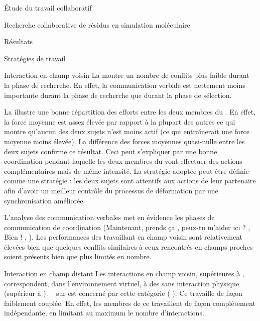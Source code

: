 \documentclass[myfrancais]{mythesis}
\begin{document}
\begin{mypart}{Étude du travail collaboratif}
\begin{mychapter}{Recherche collaborative de résidus en simulation moléculaire}
\begin{mysection}{Résultats}
\begin{mysubsection}{Stratégies de travail}
\begin{mysubsubsection}{Interaction en champ voisin}
						La  montre un nombre de conflits plus faible durant la phase de recherche.
						En effet, la communication verbale est nettement moins importante durant la phase de recherche que durant la phase de sélection.

						La  illustre une bonne répartition des efforts entre les deux membres du .
						En effet, la force moyenne est assez élevée par rapport à la plupart des autres  ce qui montre qu'aucun des deux sujets n'est moins actif (ce qui entraînerait une force moyenne moins élevée).
						La différence des forces moyennes quasi-nulle entre les deux sujets confirme ce résultat.
						Ceci peut s'expliquer par une bonne coordination pendant laquelle les deux membres du  vont effectuer des actions complémentaires mais de même intensité.
						La stratégie adoptée peut être définie comme une stratégie  : les deux sujets sont attentifs aux actions de leur partenaire afin d'avoir un meilleur contrôle du processus de déformation par une synchronisation améliorée.

						L'analyse des communication verbales met en évidence les phases de communication de coordination (\og Maintenant, prends ça \fg, \og peux-tu m'aider ici ? \fg, \og Bien ! \fg, \myetc).
						Les performances des  travaillant en champ voisin sont relativement élevées bien que quelques conflits similaires à ceux rencontrés en champs proches soient présents bien que plus limités en nombre.
					\end{mysubsubsection}
					\begin{mysubsubsection}{Interaction en champ distant}
						Les interactions en champ voisin, supérieures à , correspondent, dans l'environnement virtuel, à des  sans interaction physique (supérieur à ).
						~ sur  est concerné par cette catégorie ( ).
						Ce  travaille de façon faiblement couplée.
						En effet, les membres de ce  travaillent de façon complétement indépendante, en limitant au maximum le nombre d'interactions.


\end{mysubsubsection}
\end{mysubsection}
\end{mysection}
\end{mychapter}
\end{mypart}
\end{document}
